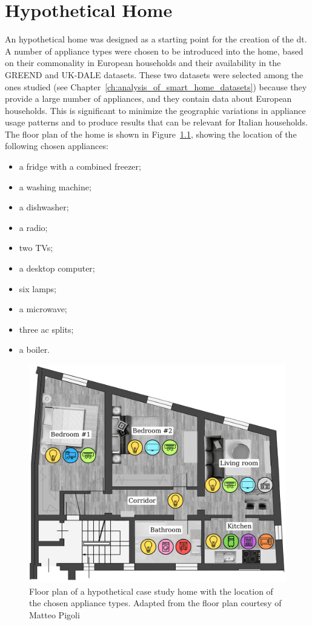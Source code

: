 \chapter{Hypothetical Home}\label{ch:hypothetical_home}

An hypothetical home was designed as a starting point for the creation of the \acrshort{dt}. A number of appliance types were chosen to be introduced into the home, based on their commonality in European households and their availability in the GREEND and UK-DALE datasets. These two datasets were selected among the ones studied (see Chapter~\ref{ch:analysis_of_smart_home_datasets}) because they provide a large number of appliances, and they contain data about European households. This is significant to minimize the geographic variations in appliance usage patterns and to produce results that can be relevant for Italian households. The floor plan of the home is shown in Figure~\ref{fig:home_floor_plan}, showing the location of the following chosen appliances:
\begin{itemize}
  \item a fridge with a combined freezer;
  \item a washing machine;
  \item a dishwasher;
  \item a radio;
  \item two TVs;
  \item a desktop computer;
  \item six lamps;
  \item a microwave;
  \item three \acrshort{ac} splits;
  \item a boiler.
\end{itemize}

\begin{figure}
  \centering
  \includegraphics[width=0.75\linewidth]{images/floor_plan.png}
  \caption[Floor plan of a hypothetical case study home with the location of the chosen appliance types.]{Floor plan of a hypothetical case study home with the location of the chosen appliance types. Adapted from the floor plan courtesy of Matteo Pigoli}
  \label{fig:home_floor_plan}
\end{figure}

